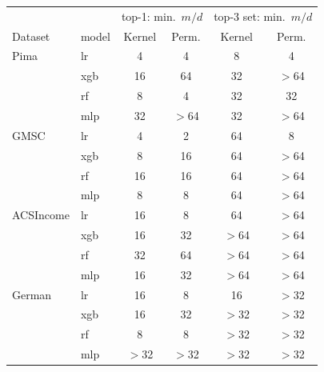 \begin{tabular}{llcccc}
\toprule
& & \multicolumn{2}{c}{top-1: min.\ $m/d$} & \multicolumn{2}{c}{top-3 set: min.\ $m/d$}\\
Dataset & model & Kernel & Perm. & Kernel & Perm.\\
\midrule
Pima & lr & 4 & 4 & 8 & 4\\
 & xgb & 16 & 64 & 32 & $>$64\\
 & rf & 8 & 4 & 32 & 32\\
 & mlp & 32 & $>$64 & 32 & $>$64\\
\midrule
GMSC & lr & 4 & 2 & 64 & 8\\
 & xgb & 8 & 16 & 64 & $>$64\\
 & rf & 16 & 16 & 64 & $>$64\\
 & mlp & 8 & 8 & 64 & $>$64\\
\midrule
ACSIncome & lr & 16 & 8 & 64 & $>$64\\
 & xgb & 16 & 32 & $>$64 & $>$64\\
 & rf & 32 & 64 & $>$64 & $>$64\\
 & mlp & 16 & 32 & $>$64 & $>$64\\
\midrule
German & lr & 16 & 8 & 16 & $>$32\\
 & xgb & 16 & 32 & $>$32 & $>$32\\
 & rf & 8 & 8 & $>$32 & $>$32\\
 & mlp & $>$32 & $>$32 & $>$32 & $>$32\\
\bottomrule
\end{tabular}

